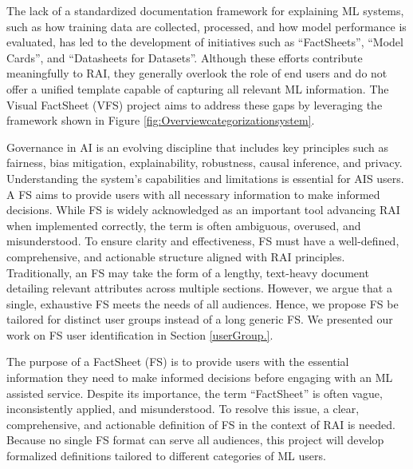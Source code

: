 \documentclass[manuscript,review,anonymous]{acmart}
\begin{document}
	The lack of a standardized documentation framework for explaining ML systems, such as how training data are collected, processed, and how model performance is evaluated, has led to the development of initiatives such as \enquote{FactSheets}, \enquote{Model Cards}, and \enquote{Datasheets for Datasets}. Although these efforts contribute meaningfully to RAI, they generally overlook the role of end users and do not offer a unified template capable of capturing all relevant ML information. The Visual FactSheet (VFS) project aims to address these gaps by leveraging the framework shown in Figure \ref{fig:Overviewcategorizationsystem}.

	Governance in AI is an evolving discipline that includes key principles such as fairness, bias mitigation, explainability, robustness, causal inference, and privacy. Understanding the system's capabilities and limitations is essential for AIS users. A FS aims to provide users with all necessary information to make informed decisions. While FS is widely acknowledged as an important tool advancing RAI when implemented correctly, the term is often ambiguous, overused, and misunderstood. To ensure clarity and effectiveness, FS must have a well-defined, comprehensive, and actionable structure aligned with RAI principles. Traditionally, an FS may take the form of a lengthy, text-heavy document detailing relevant attributes across multiple sections. However, we argue that a single, exhaustive FS meets the needs of all audiences. Hence, we propose FS be tailored for distinct user groups instead of a long generic FS. We presented our work on FS user identification in Section \ref{userGroup.}.

	The purpose of a FactSheet (FS) is to provide users with the essential information they need to make informed decisions before engaging with an ML assisted service. Despite its importance, the term \enquote{FactSheet} is often vague, inconsistently applied, and misunderstood. To resolve this issue, a clear, comprehensive, and actionable definition of FS in the context of RAI is needed. Because no single FS format can serve all audiences, this project will develop formalized definitions tailored to different categories of ML users.
\end{document}
